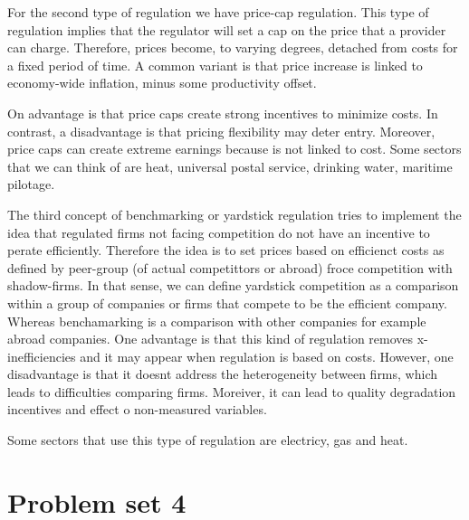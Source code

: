 \documentclass[11pt]{article} %
\begin{document}
For the second type of regulation we have price-cap regulation. This type of regulation implies that the regulator will set a cap on the price that a provider can charge. Therefore, prices become, to varying degrees, detached from costs for a fixed period of time. A common variant is that price increase is linked to economy-wide inflation, minus some productivity offset.

On advantage is that price caps create strong incentives to minimize costs. In contrast, a disadvantage is that pricing flexibility may deter entry. Moreover, price caps can create extreme earnings because is not linked to cost. 
Some sectors that we can think of are heat, universal postal service, drinking water, maritime pilotage.

The third concept of benchmarking or yardstick regulation tries to implement the idea that regulated firms not facing competition do not have an incentive to perate efficiently. Therefore the idea is to set prices based on efficienct costs as defined by peer-group (of actual competittors or abroad) froce competition with shadow-firms. In that sense, we can define yardstick competition as a comparison within a group of companies or firms that compete to be the efficient company. Whereas benchamarking is a comparison with other companies for example abroad companies. One advantage is that this kind of regulation removes x-inefficiencies and it may appear when regulation is based on costs. However, one disadvantage is that it doesnt address the heterogeneity between firms, which leads to difficulties comparing firms. Moreiver, it can lead to quality degradation incentives and effect o non-measured variables.

Some sectors that use this type of regulation are electricy, gas and heat.

\section{Problem set 4}
\end{document}
